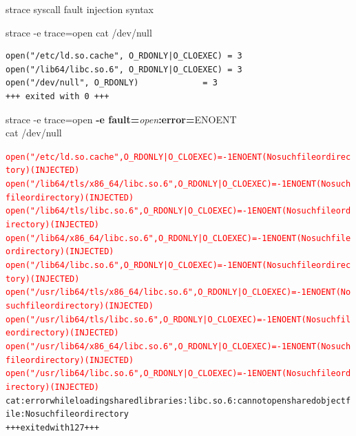 \documentclass[unicode]{beamer}
\begin{document}
\begin{frame}[fragile]{strace syscall fault injection syntax}
\scriptsize
\begin{block}{\large strace -e trace=open cat /dev/null}
\begin{verbatim}
open("/etc/ld.so.cache", O_RDONLY|O_CLOEXEC) = 3
open("/lib64/libc.so.6", O_RDONLY|O_CLOEXEC) = 3
open("/dev/null", O_RDONLY)             = 3
+++ exited with 0 +++
\end{verbatim}
\end{block}
\begin{block}{\large strace -e trace=open {\bf -e fault=}{\it open}{\bf :error=}{\sc ENOENT} \\ cat /dev/null}
\begin{alltt}
\textcolor{red}{open("/etc/ld.so.cache", O_RDONLY|O_CLOEXEC) = -1 ENOENT (No such file or directory) (INJECTED)}
\textcolor{red}{open("/lib64/tls/x86_64/libc.so.6", O_RDONLY|O_CLOEXEC) = -1 ENOENT (No such file or directory) (INJECTED)}
\textcolor{red}{open("/lib64/tls/libc.so.6", O_RDONLY|O_CLOEXEC) = -1 ENOENT (No such file or directory) (INJECTED)}
\textcolor{red}{open("/lib64/x86_64/libc.so.6", O_RDONLY|O_CLOEXEC) = -1 ENOENT (No such file or directory) (INJECTED)}
\textcolor{red}{open("/lib64/libc.so.6", O_RDONLY|O_CLOEXEC) = -1 ENOENT (No such file or directory) (INJECTED)}
\textcolor{red}{open("/usr/lib64/tls/x86_64/libc.so.6", O_RDONLY|O_CLOEXEC) = -1 ENOENT (No such file or directory) (INJECTED)}
\textcolor{red}{open("/usr/lib64/tls/libc.so.6", O_RDONLY|O_CLOEXEC) = -1 ENOENT (No such file or directory) (INJECTED)}
\textcolor{red}{open("/usr/lib64/x86_64/libc.so.6", O_RDONLY|O_CLOEXEC) = -1 ENOENT (No such file or directory) (INJECTED)}
\textcolor{red}{open("/usr/lib64/libc.so.6", O_RDONLY|O_CLOEXEC) = -1 ENOENT (No such file or directory) (INJECTED)}
cat: error while loading shared libraries: libc.so.6: cannot open shared object file: No such file or directory
+++ exited with 127 +++
\end{alltt}
\end{block}
\end{frame}
\end{document}
